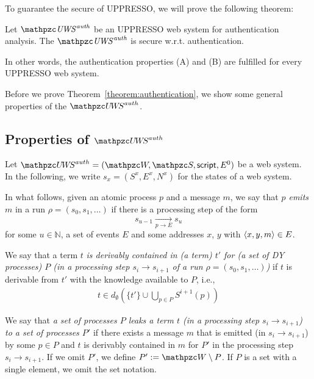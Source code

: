   To guarantee the secure of UPPRESSO, we will prove the following theorem:
  \begin{theorem}\label{theorem:authentication}
  Let $\mi{\uppressoauthwebsystem}$ be an UPPRESSO web system for authentication analysis. The $\mi{\uppressoauthwebsystem}$ is secure w.r.t. authentication.

  \end{theorem}
  In other words, the authentication properties (A) and (B) are fulfilled for every UPPRESSO web system.
  
  Before we prove Theorem~\ref{theorem:authentication}, we show some general properties of the $\uppressoauthwebsystem$.

\subsection{Properties of $\uppressoauthwebsystem$}

Let $\uppressoauthwebsystem = (\bidsystem, \scriptset, \mathsf{script}, E^0)$
be a web system. In the following, we write $s_x = (S^x,E^x,N^x)$ for the
states of a web system.

\begin{definition}\label{def:emitting}
  In what follows, given an atomic process $p$ and a message $m$, we
  say that \emph{$p$ emits $m$} in a run $\rho=(s_0,s_1,\ldots)$ if
  there is a processing step  of the form
  \[ s_{u-1} \xrightarrow[p \rightarrow E]{} s_{u}\] for some $u \in
  \mathbb{N}$, a set of events $E$ and some addresses $x$, $y$ with
  $\langle x,y,m\rangle \in E$.
\end{definition}

\begin{definition}\label{def:contains}
  We say that a term $t$ \emph{is derivably contained in (a term) $t'$
    for (a set of DY processes) $P$ (in a processing step $s_i
    \rightarrow s_{i+1}$ of a run $\rho=(s_0,s_1,\ldots)$)} if $t$ is
  derivable from $t'$ with the knowledge available to $P$, i.e.,
  \begin{align*}
    t \in d_{\emptyset}(\{t'\} \cup \bigcup_{p\in P}S^{i+1}(p))
  \end{align*}

\end{definition}

\begin{definition}\label{def:leak}
  We say that \emph{a set of processes $P$ leaks a term $t$ (in a
    processing step $s_i \rightarrow s_{i+1}$) to a set of processes
    $P'$} if there exists a message $m$ that is emitted (in $s_i
  \rightarrow s_{i+1}$) by some $p \in P$ and $t$ is derivably
  contained in $m$ for $P'$ in the processing step $s_i \rightarrow
  s_{i+1}$. If we omit $P'$, we define $P' := \bidsystem \setminus
  P$. If $P$ is a set with a single element, we omit the set notation.
\end{definition}


